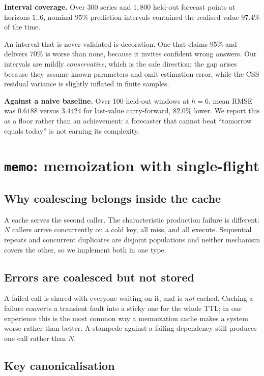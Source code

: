 \documentclass[10pt,twocolumn]{article}
\begin{document}
\noindent\textbf{Interval coverage.} Over $300$ series and $1{,}800$ held-out
forecast points at horizons $1..6$, nominal $95\%$ prediction intervals contained
the realised value $97.4\%$ of the time.

An interval that is never validated is decoration. One that claims $95\%$ and
delivers $70\%$ is worse than none, because it invites confident wrong answers.
Our intervals are mildly \emph{conservative}, which is the safe direction; the
gap arises because they assume known parameters and omit estimation error, while
the CSS residual variance is slightly inflated in finite samples.

\noindent\textbf{Against a naive baseline.} Over $100$ held-out windows at
$h{=}6$, mean RMSE was $0.6188$ versus $3.4424$ for last-value carry-forward,
$82.0\%$ lower. We report this as a floor rather than an achievement: a
forecaster that cannot beat ``tomorrow equals today'' is not earning its
complexity.

\section{\texttt{memo}: memoization with single-flight}

\subsection{Why coalescing belongs inside the cache}

A cache serves the second caller. The characteristic production failure is
different: $N$ callers arrive concurrently on a cold key, all miss, and all
execute. Sequential repeats and concurrent duplicates are disjoint populations
and neither mechanism covers the other, so we implement both in one type.

\subsection{Errors are coalesced but not stored}

A failed call is shared with everyone waiting on it, and is \emph{not} cached.
Caching a failure converts a transient fault into a sticky one for the whole TTL;
in our experience this is the most common way a memoization cache makes a system
worse rather than better. A stampede against a failing dependency still produces
one call rather than $N$.

\subsection{Key canonicalisation}
\end{document}
